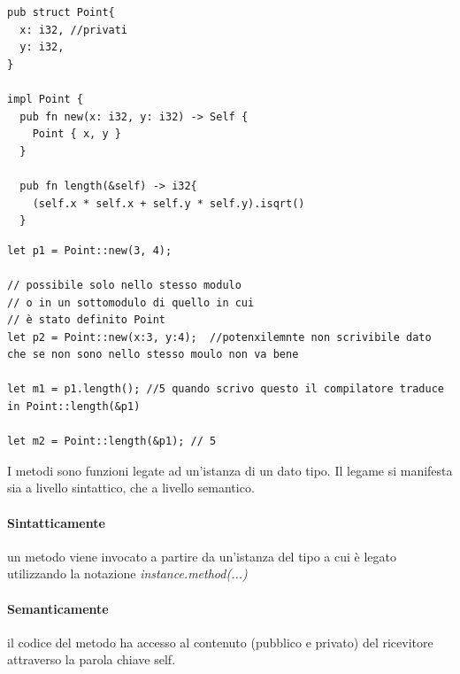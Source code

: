 \begin{center}
  \centering
  \begin{minipage}{\linewidth}
    \begin{minipage}{0.47\linewidth}
      \begin{verbatim}
pub struct Point{
  x: i32, //privati
  y: i32,
}

impl Point {
  pub fn new(x: i32, y: i32) -> Self {
    Point { x, y }
  }

  pub fn length(&self) -> i32{
    (self.x * self.x + self.y * self.y).isqrt()
  }

\end{verbatim}

    \end{minipage}%
    \hfill
    \begin{minipage}{\linewidth}
      \begin{minipage}{0.47\linewidth}
        \begin{verbatim}
let p1 = Point::new(3, 4);

// possibile solo nello stesso modulo
// o in un sottomodulo di quello in cui
// è stato definito Point
let p2 = Point::new(x:3, y:4);  //potenxilemnte non scrivibile dato che se non sono nello stesso moulo non va bene

let m1 = p1.length(); //5 quando scrivo questo il compilatore traduce in Point::length(&p1)

let m2 = Point::length(&p1); // 5

\end{verbatim}
      \end{minipage}
    \end{minipage}
  \end{minipage}
\end{center}

I metodi sono funzioni legate ad un'istanza di un dato tipo. Il legame si
manifesta sia a livello sintattico, che a livello semantico.


\paragraph{Sintatticamente} un metodo viene invocato a partire da un'istanza del tipo a cui è
legato utilizzando la notazione \textit{instance.method(...) }

\paragraph{Semanticamente} il codice del metodo ha accesso al contenuto (pubblico e privato)
del ricevitore attraverso la parola chiave self.




